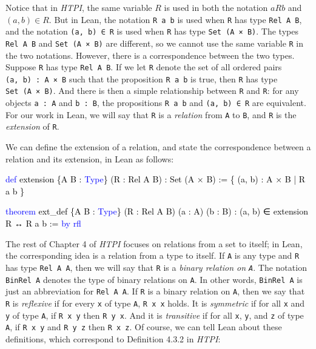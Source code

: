 \documentclass[
  letterpaper,
  DIV=11,
  numbers=noendperiod]{scrreprt}
\newenvironment{Shaded}{\begin{snugshade}}{\end{snugshade}}
\newcommand{\KeywordTok}[1]{\textcolor[rgb]{0.00,0.23,0.31}{#1}}
\newcommand{\NormalTok}[1]{\textcolor[rgb]{0.00,0.23,0.31}{#1}}
\renewcommand{\NormalTok}[1]{\textcolor[HTML]{000000}{#1}}
\renewcommand{\KeywordTok}[1]{\textcolor[HTML]{0000FF}{#1}}
\theoremstyle{remark}
\begin{document}
Notice that in \emph{HTPI}, the same variable \(R\) is used in both the
notation \(aRb\) and \((a, b) \in R\). But in Lean, the notation
\texttt{R\ a\ b} is used when \texttt{R} has type \texttt{Rel\ A\ B},
and the notation \texttt{(a,\ b)\ ∈\ R} is used when \texttt{R} has type
\texttt{Set\ (A\ ×\ B)}. The types \texttt{Rel\ A\ B} and
\texttt{Set\ (A\ ×\ B)} are different, so we cannot use the same
variable \texttt{R} in the two notations. However, there is a
correspondence between the two types. Suppose \texttt{R} has type
\texttt{Rel\ A\ B}. If we let \texttt{R\textquotesingle{}} denote the
set of all ordered pairs \texttt{(a,\ b)\ :\ A\ ×\ B} such that the
proposition \texttt{R\ a\ b} is true, then \texttt{R\textquotesingle{}}
has type \texttt{Set\ (A\ ×\ B)}. And there is then a simple
relationship between \texttt{R} and \texttt{R\textquotesingle{}}: for
any objects \texttt{a\ :\ A} and \texttt{b\ :\ B}, the propositions
\texttt{R\ a\ b} and \texttt{(a,\ b)\ ∈\ R\textquotesingle{}} are
equivalent. For our work in Lean, we will say that \texttt{R} is a
\emph{relation} from \texttt{A} to \texttt{B}, and
\texttt{R\textquotesingle{}} is the \emph{extension} of \texttt{R}.

We can define the extension of a relation, and state the correspondence
between a relation and its extension, in Lean as follows:

\begin{Shaded}
\begin{Highlighting}[]
\KeywordTok{def}\NormalTok{ extension \{A B : }\KeywordTok{Type}\NormalTok{\} (R : Rel A B) : Set (A × B) :=}
\NormalTok{  \{ (a, b) : A × B | R a b \}}

\KeywordTok{theorem}\NormalTok{ ext\_def \{A B : }\KeywordTok{Type}\NormalTok{\} (R : Rel A B) (a : A) (b : B) :}
\NormalTok{    (a, b) ∈ extension R ↔ R a b := }\KeywordTok{by} \KeywordTok{rfl}
\end{Highlighting}
\end{Shaded}

The rest of Chapter 4 of \emph{HTPI} focuses on relations from a set to
itself; in Lean, the corresponding idea is a relation from a type to
itself. If \texttt{A} is any type and \texttt{R} has type
\texttt{Rel\ A\ A}, then we will say that \texttt{R} is a \emph{binary
relation on \texttt{A}}. The notation \texttt{BinRel\ A} denotes the
type of binary relations on \texttt{A}. In other words,
\texttt{BinRel\ A} is just an abbreviation for \texttt{Rel\ A\ A}. If
\texttt{R} is a binary relation on \texttt{A}, then we say that
\texttt{R} is \emph{reflexive} if for every \texttt{x} of type
\texttt{A}, \texttt{R\ x\ x} holds. It is \emph{symmetric} if for all
\texttt{x} and \texttt{y} of type \texttt{A}, if \texttt{R\ x\ y} then
\texttt{R\ y\ x}. And it is \emph{transitive} if for all \texttt{x},
\texttt{y}, and \texttt{z} of type \texttt{A}, if \texttt{R\ x\ y} and
\texttt{R\ y\ z} then \texttt{R\ x\ z}. Of course, we can tell Lean
about these definitions, which correspond to Definition 4.3.2 in
\emph{HTPI}:
\end{document}
